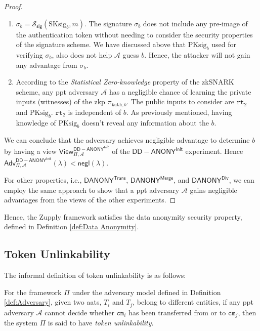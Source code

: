 \begin{proof}
\begin{enumerate}
    \item $\sigma_b = \mathcal{S}_\mathsf{sig}(\text{SKsig}_b, m)$. The signature $\sigma_b$ does not include any pre-image of the authentication token without needing to consider the security properties of the signature scheme. We have discussed above that $\text{PKsig}_b$ used for verifying $\sigma_b$, also does not help $\mathcal{A}$ guess $b$. Hence, the attacker will not gain any advantage from $\sigma_b$.

    \item According to the \textit{Statistical Zero-knowledge} property of the zkSNARK scheme, any \gls{ppt} adversary $\mathcal{A}$ has a negligible chance of learning the private inputs (witnesses) of the \gls{zkp} $\pi_{\texttt{Auth}, b}$. The public inputs to consider are $\texttt{rt}_2$ and $\text{PKsig}_b$.  $\texttt{rt}_2$ is independent of $b$. As previously mentioned, having knowledge of $\text{PKsig}_b$ doesn’t reveal any information about the $b$.
\end{enumerate}

We can conclude that the adversary achieves negligible advantage to determine $b$ by having a view $\mathsf{View}^{\mathsf{DD-ANONY}^\mathsf{Init}}_{\Pi, \mathcal{A}}$ of the $\mathsf{DD-ANONY}^\mathsf{Init}$ experiment. Hence $\mathsf{Adv}^{\mathsf{DD-ANONY}^\textsf{Init}}_{\Pi, \mathcal{A}}(\lambda) < \mathsf{negl}(\lambda)$.

For other properties, i.e.,  $\mathsf{DANONY}^\mathsf{Trans}$, $\mathsf{DANONY}^\mathsf{Merge}$, and $\mathsf{DANONY}^\mathsf{Div}$, we can employ the same approach to show that a \gls{ppt} adversary $\mathcal{A}$ gains negligible advantages from the views of the other experiments.
    \end{proof}

Hence, the Zupply framework satisfies the data anonymity security property, defined in Definition \ref{def:Data Anonymity}.


\subsection{Token Unlinkability}
\label{app-sec:Token Unlinkability}

The informal definition of token unlinkability is as follows:

\begin{definition}
    \label{def:informal-Token Unlinkability}
For the framework $\Pi$ under the adversary model defined in Definition \ref{def:Adversary}, given two \gls{aat}s, \( T_i \) and \( T_j \), belong to different entities, if any \gls{ppt} adversary $\mathcal{A}$ cannot decide whether $\texttt{cm}_i$ has been transferred from or to $\texttt{cm}_j$, then the system $\Pi$ is said to have \textit{token unlinkability}. %
\end{definition}


